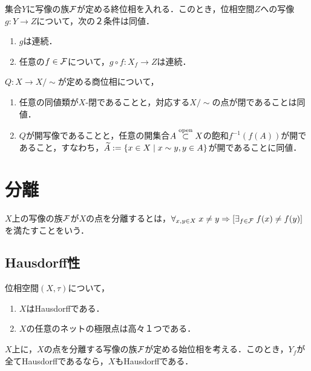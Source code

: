 \documentclass[uplatex,dvipdfmx]{jsreport}
\begin{document}
\begin{proposition}
    集合$Y$に写像の族$\mathcal{F}$が定める終位相を入れる．このとき，位相空間$Z$への写像$g:Y\to Z$について，次の２条件は同値．
    \begin{enumerate}
        \item $g$は連続．
        \item 任意の$f\in\mathcal{F}$について，$g\circ f:X_f\to Z$は連続．
    \end{enumerate}
\end{proposition}

\begin{corollary}\label{cor-for-quotient-space}
    $Q:X\to X/\sim$が定める商位相について，
    \begin{enumerate}
        \item 任意の同値類が$X$-閉であることと，対応する$X/\sim$の点が閉であることは同値．
        \item $Q$が開写像であることと，任意の開集合$A\overset{\mathrm{open}}{\subset} X$の飽和$f^{-1}(f(A))$が開であること，すなわち，$\widetilde{A}:=\left\{x\in X\mid x\sim y,y\in A\right\}$が開であることに同値．
    \end{enumerate}
\end{corollary}

\section{分離}

\begin{definition}
    $X$上の写像の族$\mathcal{F}$が$X$の点を分離するとは，$\forall_{x,y\in X}\;x\ne y\Rightarrow[\exists_{f\in\mathcal{F}}\;f(x)\ne f(y)]$を満たすことをいう．
\end{definition}

\subsection{Hausdorff性}

\begin{proposition}
    位相空間$(X,\tau)$について，
    \begin{enumerate}
        \item $X$はHausdorffである．
        \item $X$の任意のネットの極限点は高々１つである．
    \end{enumerate}
\end{proposition}

\begin{proposition}\label{prop-for-initial-topology-begin-Hausdorff}
    $X$上に，$X$の点を分離する写像の族$\mathcal{F}$が定める始位相を考える．このとき，$Y_f$が全てHausdorffであるなら，$X$もHausdorffである．
\end{proposition}
\end{document}
